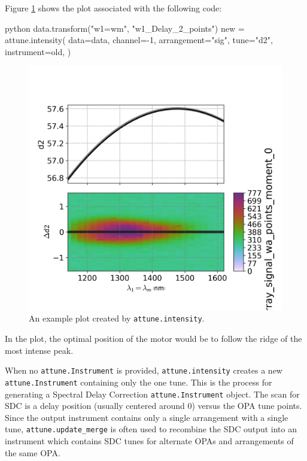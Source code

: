 Figure \ref{rep:fig:intensity} shows the plot associated with the following code:

\begin{codefragment}{python}
data.transform("w1=wm", "w1_Delay_2_points")
new = attune.intensity(
     data=data,
     channel=-1,
     arrangement="sig",
     tune="d2",
     instrument=old,
)
\end{codefragment}

\begin{figure}
\includegraphics{representation/images/intensity.png}
\caption[Intensity]{
	An example plot created by \texttt{attune.intensity}.
}
\label{rep:fig:intensity}
\end{figure}

In the plot, the optimal position of the motor would be to follow the
ridge of the most intense peak.

When no \texttt{attune.Instrument} is provided,
\texttt{attune.intensity} creates a new
\texttt{attune.Instrument} containing only the one
tune. This is the process for generating a Spectral Delay Correction
\texttt{attune.Instrument} object. The scan for SDC is a delay position
(usually centered around 0) versus the OPA tune points. Since the output
instrument contains only a single arrangement with a single tune,
\texttt{attune.update\_merge} is often used to
recombine the SDC output into an instrument which contains SDC tunes for
alternate OPAs and arrangements of the same OPA.

